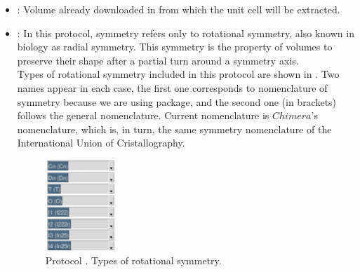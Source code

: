 \begin{itemize}
  \begin{itemize}
  \item {}: Volume already downloaded in \scipion from which the unit cell will be extracted.
  \item {}: In this protocol, symmetry refers only to rotational symmetry, also known in biology as radial symmetry. This symmetry is the property of volumes to preserve their shape after a partial turn around a symmetry axis.  \\
  Types of rotational symmetry included in this protocol are shown in . Two names appear in each case, the first one corresponds to  nomenclature of symmetry because we are using  package, and the second one (in brackets) follows the general \scipion nomenclature. Current \scipion nomenclature is $Chimera$'s nomenclature, which is, in turn, the same symmetry nomenclature of the International Union of Cristallography. 
  
    \begin{figure}[H]
    \centering 
    \captionsetup{width=.7\linewidth} 
    \includegraphics[width=0.25\textwidth]{Images_appendix/Fig108.pdf}
    \caption{Protocol . Types of rotational symmetry.}
    \label{fig:app_protocol_extractUnitCell_2}
   \end{figure}
   

\end{itemize}
\end{itemize}
